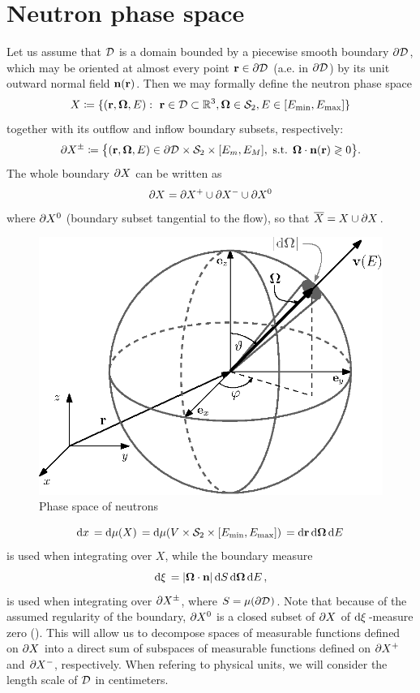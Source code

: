 \section{Neutron phase space} \label{sec:phase}
Let us assume that $\VV$ is a domain bounded by a piecewise smooth boundary $\pV$, which may be oriented at almost every
point $\br\in\pV$ (a.e. in $\pV$) by its unit outward normal field $\bn(\br)$.
Then we may formally define the neutron phase space $$
  X \coloneqq \{(\br,\bomega,E):\ \br\in \VV\subset\R[3], \bomega\in \Sphere, E \in [\Emin,\Emax]\}
$$ together with its outflow and inflow boundary subsets, respectively:
$$
  \pX[\pm] \coloneqq \bigl\{ (\br,\bomega,E) \in \pV \times \Sphere \times [E_m, E_M], \mbox{ s.t. }
  \bomega\cdot\bn(\br) \gtrless 0 \bigr\}.
$$ The whole boundary $\pX$ can be written as $$ \pX = \pX[+]\cup \pX[-] \cup \pX[0] $$ where $\pX[0]$ (boundary subset
tangential to the flow), so that $\overline X = X \cup \pX$.
\begin{figure}[!hbt]
    \centering \includegraphics[scale=1]{phase_space.eps} \caption[Phase space of neutrons]{Phase space of neutrons}
    \label{fig:phase_space}
\end{figure}%
\begin{equation}\label{eq:measure}
  \d{x} = \d{\mu(X)} = \d{\mu(V\times\Sphere\times [\Emin,\Emax])} = \d{\br}\d{\bomega}\d{E}
\end{equation}
is used when integrating over $X$, 
while the boundary measure
\begin{equation}\label{eq:measure2}
\db = \abs{\bomega\cdot\bn}\d{S}\d{\bomega}\d{E},
\end{equation}
is used when integrating over $\pX[\pm]$, where $S = \mu(\pV)$.
Note that
because of the assumed regularity of the boundary, $\pX[0]$ is a closed subset of $\pX$ of
\linebreak\mbox{$\db$-measure} zero (\cite[Chap. XXI, Sec. 2.2]{DautrayLions}). This will allow us to decompose spaces 
of measurable functions defined on $\pX$ into a direct sum of subspaces of measurable functions defined on $\pX[+]$ and 
$\pX[-]$, respectively. When refering to physical units, we will consider the length scale of $\VV$ in centimeters.

